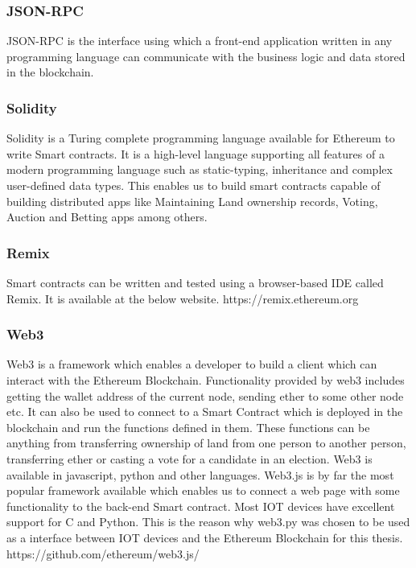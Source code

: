 \documentclass[11pt,openright]{report}
\begin{document}
\subsubsection{JSON-RPC}
JSON-RPC is the interface using which a front-end application written in any programming language can communicate with the business logic and data stored in the blockchain.

\subsubsection{Solidity}
Solidity is a Turing complete programming language available for Ethereum to write Smart contracts. It is a high-level language supporting all features of a modern programming language such as static-typing, inheritance and complex user-defined data types. This enables us to build smart contracts capable of building distributed apps like Maintaining Land ownership records, Voting, Auction and Betting apps among others.

\subsubsection{Remix}
Smart contracts can be written and tested using a browser-based IDE called Remix. It is available at the below website.
https://remix.ethereum.org

\subsubsection{Web3}
Web3 is a framework which enables a developer to build a client which can interact with the Ethereum Blockchain. Functionality provided by web3 includes getting the wallet address of the current node, sending ether to some other node etc. It can also be used to connect to a Smart Contract which is deployed in the blockchain and run the functions defined in them. These functions can be anything from transferring ownership of land from one person to another person, transferring ether or casting a vote for a candidate in an election. Web3 is available in javascript, python and other languages. Web3.js is by far the most popular framework available which enables us to connect a web page with some functionality to the back-end Smart contract. Most IOT devices have excellent support for C and Python. This is the reason why web3.py was chosen to be used as a interface between IOT devices and the Ethereum Blockchain for this thesis.
https://github.com/ethereum/web3.js/
\end{document}
